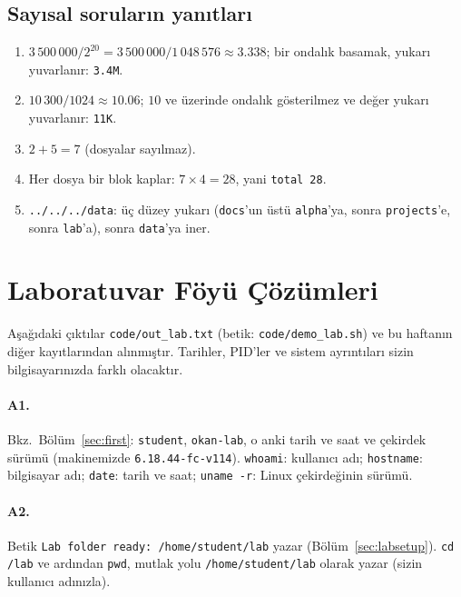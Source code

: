 \documentclass[11pt,a4paper]{article}
\newcommand{\cmd}[1]{\texttt{#1}}
\begin{document}
\subsection*{Sayısal soruların yanıtları}
\begin{enumerate}[leftmargin=1.6em,start=10]
  \item $3\,500\,000 / 2^{20} = 3\,500\,000 / 1\,048\,576 \approx 3.338$; bir ondalık basamak, yukarı yuvarlanır: \texttt{3.4M}.
  \item $10\,300 / 1024 \approx 10.06$; $10$ ve üzerinde ondalık gösterilmez ve değer yukarı yuvarlanır: \texttt{11K}.
  \item $2 + 5 = 7$ (dosyalar sayılmaz).
  \item Her dosya bir blok kaplar: $7 \times 4 = 28$, yani \texttt{total 28}.
  \item \texttt{../../../data}: üç düzey yukarı (\texttt{docs}'un üstü \texttt{alpha}'ya, sonra \texttt{projects}'e, sonra \texttt{lab}'a), sonra \texttt{data}'ya iner.
\end{enumerate}

\section{Laboratuvar Föyü Çözümleri}
\label{sec:labsol}

Aşağıdaki çıktılar \texttt{code/out\_lab.txt} (betik: \texttt{code/demo\_lab.sh}) ve bu haftanın diğer kayıtlarından alınmıştır. Tarihler, PID'ler ve sistem ayrıntıları sizin bilgisayarınızda farklı olacaktır.

\paragraph{A1.} Bkz.\ Bölüm~\ref{sec:first}: \texttt{student}, \texttt{okan-lab}, o anki tarih ve saat ve çekirdek sürümü (makinemizde \texttt{6.18.44-fc-v114}). \cmd{whoami}: kullanıcı adı; \cmd{hostname}: bilgisayar adı; \cmd{date}: tarih ve saat; \cmd{uname -r}: Linux çekirdeğinin sürümü.

\paragraph{A2.} Betik \texttt{Lab folder ready: /home/student/lab} yazar (Bölüm~\ref{sec:labsetup}). \cmd{cd \tl/lab} ve ardından \cmd{pwd}, mutlak yolu \texttt{/home/student/lab} olarak yazar (sizin kullanıcı adınızla).
\end{document}

